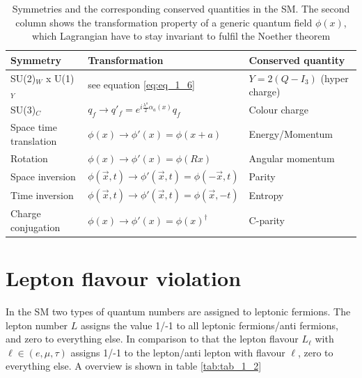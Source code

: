 \begin{table}[h]
	\centering
	\caption[Symmetries in the Standard Model]{Symmetries and the corresponding conserved quantities in the \gls{SM}. The second column shows the transformation property of a generic quantum field $\phi(x)$, which Lagrangian have to stay invariant to fulfil the Noether theorem}
	\label{tab:tab_1_1}

	\begin{tabular}{l|l|l}
		Symmetry					&Transformation										&Conserved quantity			\\ \hline
			
		SU(2)$_{W}$ x U(1)$_{Y}$			&see equation \ref{eq:eq_1_6}								&$Y = 2(Q - I_{3})$ (hyper charge)	\\ \hline
		
		SU(3)$_{C}$					&$q_{f} \rightarrow q'_{f} = e^{i\frac{\lambda^{a}}{2}\alpha_{a}(x)} q_{f}$		&Colour charge				\\ \hline \hline

		Space time translation 				&$\phi(x) \rightarrow \phi'(x) = \phi(x + a)$						&Energy/Momentum			\\ \hline

		Rotation					&$\phi(x) \rightarrow \phi'(x) = \phi(Rx)$						&Angular momentum			\\ \hline \hline

		Space inversion					&$\phi(\vec{x}, t) \rightarrow \phi'(\vec{x}, t) = \phi(-\vec{x}, t)$			&Parity					\\ \hline
		
		Time inversion					&$\phi(\vec{x}, t) \rightarrow \phi'(\vec{x}, t) = \phi(\vec{x}, -t)$	 		&Entropy				\\ \hline

		Charge conjugation				&$\phi(x) \rightarrow \phi'(x) = \phi(x)^{\dagger}$					&C-parity				
	\end{tabular}
\end{table}



\section{Lepton flavour violation}
\label{sec:section_1_3}

In the \gls{SM} two types of quantum numbers are assigned to leptonic fermions. The lepton number $L$ assigns the value 1/-1 to all leptonic fermions/anti fermions, and zero to everything else. In comparison to that the lepton flavour $L_{\ell}$ with $\ell \in (e, \mu, \tau)$ assigns 1/-1 to the lepton/anti lepton with flavour $\ell$, zero to everything else. A overview is shown in table \ref{tab:tab_1_2}


